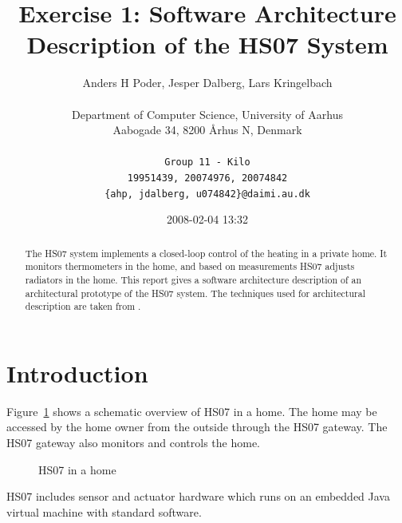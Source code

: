 \documentclass[a4paper,10pt]{article}
\begin{document}
\title{Exercise 1: Software Architecture Description of the HS07 System}

\author{
  Anders H Poder, Jesper Dalberg, Lars Kringelbach\\\\
  Department of Computer Science, University of Aarhus\\
  Aabogade 34, 8200 {\AA}rhus N, Denmark\\\\
  \makeatletter
  \texttt{Group 11 - Kilo}\\
  \texttt{19951439, 20074976, 20074842}\\
  \texttt{\{ahp, jdalberg, u074842\}@daimi.au.dk}
}

\date{2008-02-04 13:32}

\maketitle

\begin{abstract}
  The HS07 system implements a closed-loop control of the heating in a
  private home. It monitors thermometers in the home, and based on
  measurements HS07 adjusts radiators in the home. This report gives a
  software architecture description of an architectural prototype of
  the HS07 system. The techniques used for architectural description
  are taken from \cite{christensen2004archdesc}.
\end{abstract}

\section{Introduction}

Figure~\ref{fig:hs07} shows a schematic overview of HS07 in a
home. The home may be accessed by the home owner from the outside
through the HS07 gateway. The HS07 gateway also monitors and controls
the home.
\begin{figure}[!htb]
\centerline{}
\caption{HS07 in a home}
\label{fig:hs07}
\end{figure}

HS07 includes sensor and actuator hardware which runs on an embedded Java virtual
machine with standard software.

\end{document}
